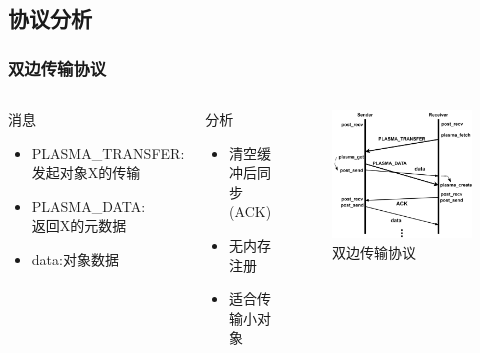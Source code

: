 \subsection*{协议分析}
\begin{frame}
	\frametitle{双边传输协议}
	\begin{columns}[onlytextwidth]
		\begin{block}{消息}
			\begin{itemize}
				\item PLASMA\_TRANSFER:\\发起对象X的传输
				\item PLASMA\_DATA:\\返回X的元数据
				\item data:对象数据
			\end{itemize}
		\end{block}
		\begin{block}{分析}
			\begin{itemize}
				\item 清空缓冲后同步(ACK)
				\item 无内存注册
				\item 适合传输小对象
			\end{itemize}
		\end{block}
		\begin{figure}
			\centering
			\includegraphics[width=\textwidth]{image/chap03/send_protocol.png}
			\caption{双边传输协议}
		\end{figure}
	\end{columns}
\end{frame}


